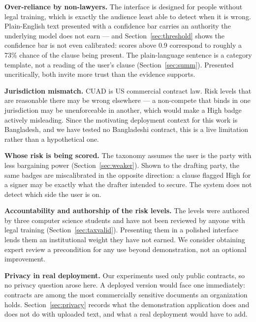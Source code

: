 \documentclass[12pt, a4paper, oneside]{report}
\begin{document}
\textbf{Over-reliance by non-lawyers.} The interface is designed for people without legal training, which is exactly the audience least able to detect when it is wrong. Plain-English text presented with a confidence bar carries an authority the underlying model does not earn --- and Section~\ref{sec:threshold} shows the confidence bar is not even calibrated: scores above 0.9 correspond to roughly a 73\% chance of the clause being present. The plain-language sentence is a category template, not a reading of the user's clause (Section~\ref{sec:summ}). Presented uncritically, both invite more trust than the evidence supports.

\textbf{Jurisdiction mismatch.} CUAD is US commercial contract law. Risk levels that are reasonable there may be wrong elsewhere --- a non-compete that binds in one jurisdiction may be unenforceable in another, which would make a High badge actively misleading. Since the motivating deployment context for this work is Bangladesh, and we have tested no Bangladeshi contract, this is a live limitation rather than a hypothetical one.

\textbf{Whose risk is being scored.} The taxonomy assumes the user is the party with less bargaining power (Section~\ref{sec:weaker}). Shown to the drafting party, the same badges are miscalibrated in the opposite direction: a clause flagged High for a signer may be exactly what the drafter intended to secure. The system does not detect which side the user is on.

\textbf{Accountability and authorship of the risk levels.} The levels were authored by three computer science students and have not been reviewed by anyone with legal training (Section~\ref{sec:taxvalid}). Presenting them in a polished interface lends them an institutional weight they have not earned. We consider obtaining expert review a precondition for any use beyond demonstration, not an optional improvement.

\textbf{Privacy in real deployment.} Our experiments used only public contracts, so no privacy question arose here. A deployed version would face one immediately: contracts are among the most commercially sensitive documents an organization holds. Section~\ref{sec:privacy} records what the demonstration application does and does not do with uploaded text, and what a real deployment would have to add.
\end{document}
